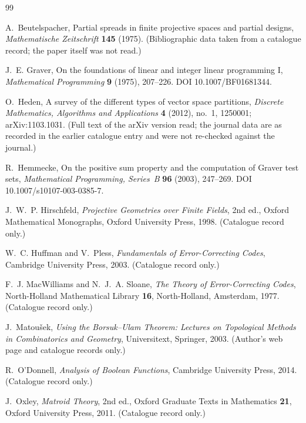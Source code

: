 \begin{thebibliography}{99}

A.~Beutelspacher, Partial spreads in finite projective spaces and partial designs, \emph{Mathematische Zeitschrift} \textbf{145} (1975). (Bibliographic data taken from a catalogue record; the paper itself was not read.)

J.~E. Graver, On the foundations of linear and integer linear programming I, \emph{Mathematical Programming} \textbf{9} (1975), 207--226. DOI 10.1007/BF01681344.

O.~Heden, A survey of the different types of vector space partitions, \emph{Discrete Mathematics, Algorithms and Applications} \textbf{4} (2012), no.~1, 1250001; arXiv:1103.1031. (Full text of the arXiv version read; the journal data are as recorded in the earlier catalogue entry and were not re-checked against the journal.)

R.~Hemmecke, On the positive sum property and the computation of Graver test sets, \emph{Mathematical Programming, Series~B} \textbf{96} (2003), 247--269. DOI 10.1007/s10107-003-0385-7.

J.~W.~P. Hirschfeld, \emph{Projective Geometries over Finite Fields}, 2nd ed., Oxford Mathematical Monographs, Oxford University Press, 1998. (Catalogue record only.)

W.~C. Huffman and V.~Pless, \emph{Fundamentals of Error-Correcting Codes}, Cambridge University Press, 2003. (Catalogue record only.)

F.~J. MacWilliams and N.~J.~A. Sloane, \emph{The Theory of Error-Correcting Codes}, North-Holland Mathematical Library \textbf{16}, North-Holland, Amsterdam, 1977. (Catalogue record only.)

J.~Matou\v{s}ek, \emph{Using the Borsuk--Ulam Theorem: Lectures on Topological Methods in Combinatorics and Geometry}, Universitext, Springer, 2003. (Author's web page and catalogue records only.)

R.~O'Donnell, \emph{Analysis of Boolean Functions}, Cambridge University Press, 2014. (Catalogue record only.)

J.~Oxley, \emph{Matroid Theory}, 2nd ed., Oxford Graduate Texts in Mathematics \textbf{21}, Oxford University Press, 2011. (Catalogue record only.)


\end{thebibliography}
